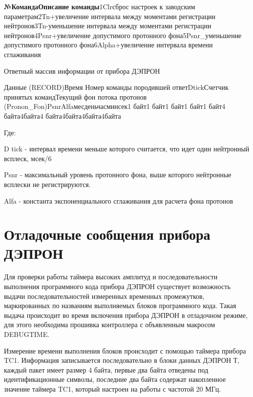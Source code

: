 \textbf{{\small №КомандаОписание команды}}{\small 1Clr}{\small сброс настроек к заводским параметрам2Tn+увеличение интервала между моментами регистрации нейтронов3Tn-уменьшение интервала между моментами регистрации нейтронов4Psnr+увеличение допустимого протонного фона5Psnr\_уменьшение допустимого протонного фона6Alpha+увеличение интервала времени сглаживания}


Ответный массив информации от прибора ДЭПРОН


{\small Данные (RECORD)Время Номер команды породившей ответD}{\small  }{\small tickСчетчик принятых командТекущий фон потока протонов (}{\small Pronon}{\small \_}{\small Fon}{\small )PsnrAlfaмесденьчасминсек1 байт1 байт1 байт1 байт1 байт4 байта}{\small 4}{\small  байта4 байта}{\small 4}{\small  байта}{\small 4}{\small  байта}{\small 4}{\small  байта}


\begin{flushleft}
	Где:
\end{flushleft}


\begin{flushleft}
	D tick - интервал времени меньше которого считается, что идет один нейтронный всплеск, мсек/6
\end{flushleft}


Psnr - максимальный уровень протонного фона, выше которого нейтронные всплески не регистрируются.


Alfa - константа экспоненциального сглаживания для расчета фона протонов





\section{Отладочные сообщения прибора ДЭПРОН}



Для проверки работы таймера высоких амплитуд и последовательности выполнения программного кода прибора ДЭПРОН существует возможность выдачи последовательностей измеренных временных промежутков, маркированных по названиям выполняемых блоков программного кода. Такая выдача происходит во время включения прибора ДЭПРОН в отладочном режиме, для этого необходима прошивка контроллера с объявленным макросом DEBUGTIME.


Измерение времени выполнения блоков происходит с помощью таймера прибора TC1. Информация записывается последовательно в блоки данных ДЭПРОН Т, каждый пакет имеет размер 4 байта, первые два байта отведены под идентификационные символы, последние два байта содержат накопленное значение таймера TC1, который настроен на работы с частотой 20 МГц.


